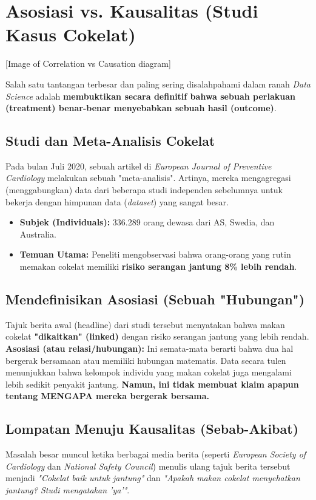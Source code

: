 \documentclass[12pt,a4paper]{article}
\begin{document}
\newpage
\section{Asosiasi vs. Kausalitas (Studi Kasus Cokelat)}


[Image of Correlation vs Causation diagram]


Salah satu tantangan terbesar dan paling sering disalahpahami dalam ranah \textit{Data Science} adalah \textbf{membuktikan secara definitif bahwa sebuah perlakuan (treatment) benar-benar menyebabkan sebuah hasil (outcome)}.

\subsection{Studi dan Meta-Analisis Cokelat}
Pada bulan Juli 2020, sebuah artikel di \textit{European Journal of Preventive Cardiology} melakukan sebuah "meta-analisis". Artinya, mereka mengagregasi (menggabungkan) data dari beberapa studi independen sebelumnya untuk bekerja dengan himpunan data (\textit{dataset}) yang sangat besar.
\begin{itemize}
    \item \textbf{Subjek (Individuals):} 336.289 orang dewasa dari AS, Swedia, dan Australia.
    \item \textbf{Temuan Utama:} Peneliti mengobservasi bahwa orang-orang yang rutin memakan cokelat memiliki \textbf{risiko serangan jantung 8\% lebih rendah}.
\end{itemize}

\subsection{Mendefinisikan Asosiasi (Sebuah "Hubungan")}
Tajuk berita awal (headline) dari studi tersebut menyatakan bahwa makan cokelat \textbf{"dikaitkan" (linked)} dengan risiko serangan jantung yang lebih rendah. 
\textbf{Asosiasi (atau relasi/hubungan):} Ini semata-mata berarti bahwa dua hal bergerak bersamaan atau memiliki hubungan matematis. Data secara tulen menunjukkan bahwa kelompok individu yang makan cokelat juga mengalami lebih sedikit penyakit jantung. \textbf{Namun, ini tidak membuat klaim apapun tentang MENGAPA mereka bergerak bersama.}

\subsection{Lompatan Menuju Kausalitas (Sebab-Akibat)}
Masalah besar muncul ketika berbagai media berita (seperti \textit{European Society of Cardiology} dan \textit{National Safety Council}) menulis ulang tajuk berita tersebut menjadi \textit{"Cokelat baik untuk jantung"} dan \textit{"Apakah makan cokelat menyehatkan jantung? Studi mengatakan 'ya'"}.
\end{document}
